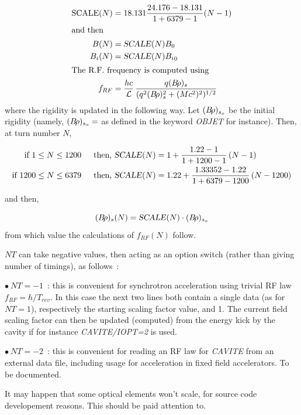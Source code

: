 \begin{align*}
   \text{SCALE}(N) & = 18.131 \dfrac{24.176-18.131 }{ 1+6379-1} (N-1)  \\
\intertext{and then}
     B(N)   &  = \text{\textsl{SCALE}}(N)B_0 \\ 
     B_i(N) &  = \text{\textsl{SCALE}}(N){B_i}_0 \\
\intertext{The  R.F. frequency is computed using}
     f_{RF} & = \dfrac{hc }{\mathcal{L}} \, 
              \dfrac{q(B\!\rho )_s }{ (q^2(B\!\rho )^2_s + (Mc^2)^2)^{1/2}} 
\end{align*}
%
where the rigidity is updated in the following way. Let $ (B\!\rho)_{s_o} $ be the 
initial rigidity (namely, $ (B\!\rho )_{s_o}= $ \BORO as defined in the keyword
\textsl{OBJET} for instance). Then, at turn number $ N$,   

\begin{alignat*}{2}
	\text{if  }   1 & \leq N\leq 1200 \,          
	            & \text{  then,  \textsl{SCALE}}(N)  & =1+ \dfrac{1.22-1 }{ 1+1200-1}\, (N-1) \\
	\text{if  }   1200 & \leq N\leq 6379 \,           
	            & \text{  then,  \textsl{SCALE}}(N)  & =1.22+ \dfrac{1.33352-1.22 }{ 1+6379-1200}\,(N-1200)    
\end{alignat*}
 
 \noindent and then,

$$ (B\!\rho )_s(N) = \text{\textsl{SCALE}}(N)\cdot (B\!\rho )_{s_o} $$
%
from which value the calculations of $ f_{RF}(N) $ follow. 


\bigskip

 \noindent $NT$ can take negative values, then acting as an option switch (rather than giving number of timings), as follows~: 

$\bullet ~ NT = -1$~: this is convenient for synchrotron acceleration using trivial RF law $f_{RF} = h/T_{rev}$. In this case 
the next two lines both contain a single data (as for $NT=1$), respectively the starting scaling factor value, and 1.  
The current field scaling factor can then be updated (computed) 
 from the energy kick by the cavity if for instance \textsl{CAVITE/IOPT=2} is used. 

$\bullet ~ NT = -2$~: this is convenient for reading an RF law for \textsl{CAVITE} from an external data file, 
including usage for acceleration in fixed field accelerators. To be documented. 


\bigskip

 It may happen that some optical elements won't scale, for source code developement reasons. 
This should be paid attention to. 



